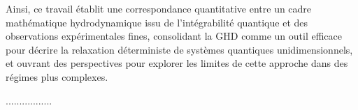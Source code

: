 Ainsi, ce travail établit une correspondance quantitative entre un cadre mathématique hydrodynamique issu de l’intégrabilité quantique et des observations expérimentales fines, consolidant la GHD comme un outil efficace pour décrire la relaxation déterministe de systèmes quantiques unidimensionnels, et ouvrant des perspectives pour explorer les limites de cette approche dans des régimes plus complexes.
 




.................
